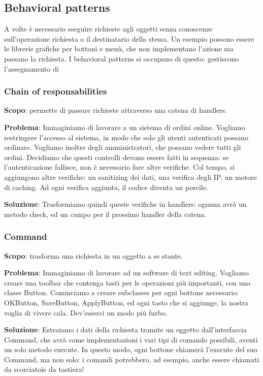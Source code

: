 \documentclass{article}
\begin{document}
\subsection{Behavioral patterns}
A volte è necessario eseguire richieste agli oggetti senza conoscenze sull'operazione
 richiesta o il destinatario della stessa. Un esempio possono essere le librerie grafiche
  per bottoni e menù, che non implementano l'azione ma passano la richiesta.
   I behavioral patterns si occupano di questo: gestiscono l'assegnamento di

\subsubsection{Chain of responsabilities}
\textbf{Scopo}: permette di passare richieste attraverso una catena di handlers.

\textbf{Problema}: Immaginiamo di lavorare a un sistema di ordini online. Vogliamo restringere l'accesso al
sistema, in modo che solo gli utenti autenticati possano ordinare. Vogliamo inoltre degli amministratori,
che possano vedere tutti gli ordini. Decidiamo che questi controlli devono essere fatti in sequenza: se
l'autenticazione fallisce, non è necessario fare altre verifiche. Col tempo, si aggiungono altre verifiche: un
sanitizing dei dati, una verifica degli IP, un motore di caching. Ad ogni verifica aggiunta, il codice diventa
un porcile.

\textbf{Soluzione}: Trasformiamo quindi queste verifiche in handlers: ognuna avrà un metodo check, ed un
campo per il prossimo handler della catena.

\subsubsection{Command}
\textbf{Scopo}: trasforma una richiesta in un oggetto a se stante.


\textbf{Problema}: Immaginiamo di lavorare ad un software di text editing. Vogliamo creare una toolbar che
contenga tasti per le operazioni più importanti, con una classe Button. Cominciamo a creare subclasses
per ogni bottone necessario: OKButton, SaveButton, ApplyButton, ed ogni tasto che si aggiunge, la nostra
voglia di vivere cala. Dev'esserci un modo più furbo.

\textbf{Soluzione}: Estraiamo i dati della richiesta tramite un oggetto dall'interfaccia Command, che avrà come
implementazioni i vari tipi di comando possibili, aventi un solo metodo execute. In questo modo, 
ogni bottone chiamerà l'execute del suo Command, ma non solo: i comandi potrebbero, ad esempio, anche essere
chiamati da scorciatoie da tastiera!
\end{document}
